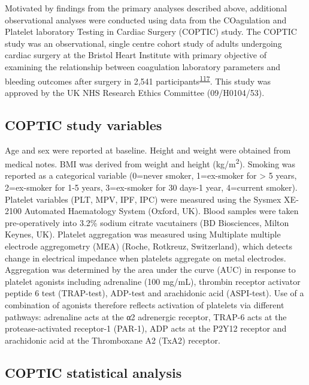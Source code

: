 \documentclass[11pt,twoside]{bristolthesis}
\begin{document}
Motivated by findings from the primary analyses described above, additional observational analyses were conducted using data from the COagulation and Platelet laboratory Testing in Cardiac Surgery (COPTIC) study. The COPTIC study was an observational, single centre cohort study of adults undergoing cardiac surgery at the Bristol Heart Institute with primary objective of examining the relationship between coagulation laboratory parameters and bleeding outcomes after surgery in 2,541 participants\textsuperscript{\protect\hyperlink{ref-Mumford2017}{117}}. This study was approved by the UK NHS Research Ethics Committee (09/H0104/53).

\hypertarget{coptic-study-variables}{%
\subsection{COPTIC study variables}\label{coptic-study-variables}}

Age and sex were reported at baseline. Height and weight were obtained from medical notes. BMI was derived from weight and height (kg/m\textsuperscript{2}). Smoking was reported as a categorical variable (0=never smoker, 1=ex-smoker for \textgreater{} 5 years, 2=ex-smoker for 1-5 years, 3=ex-smoker for 30 days-1 year, 4=current smoker). Platelet variables (PLT, MPV, IPF, IPC) were measured using the Sysmex XE-2100 Automated Haematology System (Oxford, UK). Blood samples were taken pre-operatively into 3.2\% sodium citrate vacutainers (BD Biosciences, Milton Keynes, UK). Platelet aggregation was measured using Multiplate multiple electrode aggregometry (MEA) (Roche, Rotkreuz, Switzerland), which detects change in electrical impedance when platelets aggregate on metal electrodes. Aggregation was determined by the area under the curve (AUC) in response to platelet agonists including adrenaline (100 mg/mL), thrombin receptor activator peptide 6 test (TRAP-test), ADP-test and arachidonic acid (ASPI-test). Use of a combination of agonists therefore reflects activation of platelets via different pathways: adrenaline acts at the α2 adrenergic receptor, TRAP-6 acts at the protease-activated receptor-1 (PAR-1), ADP acts at the P2Y12 receptor and arachidonic acid at the Thromboxane A2 (TxA2) receptor.

\hypertarget{coptic-statistical-analysis}{%
\subsection{COPTIC statistical analysis}\label{coptic-statistical-analysis}}
\end{document}
